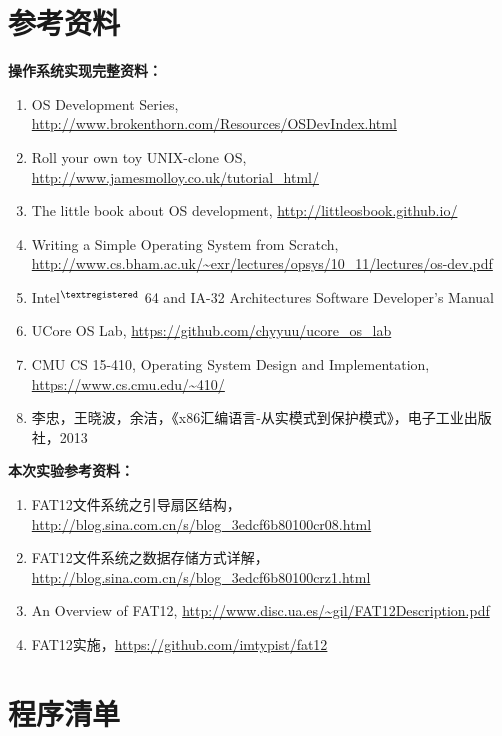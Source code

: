 \documentclass[logo,reportComp]{thesis}
\begin{document}
\section{参考资料}
\textbf{操作系统实现完整资料：}
\begin{enumerate}
	\item OS Development Series, \url{http://www.brokenthorn.com/Resources/OSDevIndex.html}
	\item Roll your own toy UNIX-clone OS, \url{http://www.jamesmolloy.co.uk/tutorial_html/}
	\item The little book about OS development, \url{http://littleosbook.github.io/}
	\item Writing a Simple Operating System from Scratch, \url{http://www.cs.bham.ac.uk/~exr/lectures/opsys/10_11/lectures/os-dev.pdf}
	\item Intel$^{\textregistered}$ 64 and IA-32 Architectures Software Developer's Manual
	\item UCore OS Lab, \url{https://github.com/chyyuu/ucore_os_lab}
	\item CMU CS 15-410, Operating System Design and Implementation, \url{https://www.cs.cmu.edu/~410/}
	\item 李忠，王晓波，余洁，《x86汇编语言-从实模式到保护模式》，电子工业出版社，2013
\end{enumerate}

\textbf{本次实验参考资料：}
\begin{enumerate}
	\item FAT12文件系统之引导扇区结构，\url{http://blog.sina.com.cn/s/blog_3edcf6b80100cr08.html}
	\item FAT12文件系统之数据存储方式详解，\url{http://blog.sina.com.cn/s/blog_3edcf6b80100crz1.html}
	\item An Overview of FAT12, \url{http://www.disc.ua.es/~gil/FAT12Description.pdf}
	\item FAT12实施，\url{https://github.com/imtypist/fat12}
\end{enumerate}

\appendix
\appendixconfig
\section{程序清单}
\end{document}
